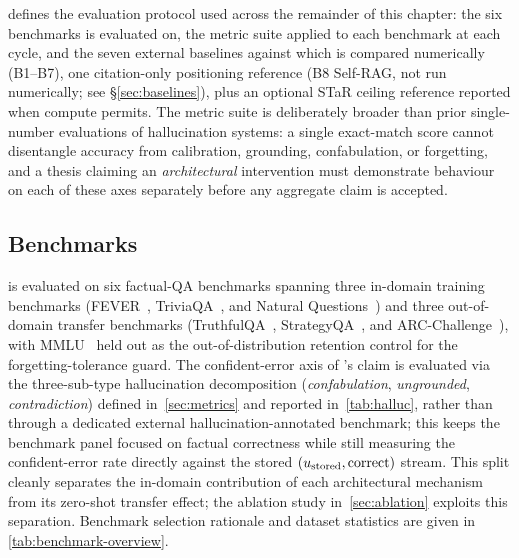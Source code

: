  defines the evaluation protocol used across the
remainder of this chapter: the six benchmarks \caem{} is evaluated on,
the metric suite applied to each benchmark at each cycle, and the seven
external baselines against which \caem{} is compared numerically
(B1--B7), one citation-only positioning reference (B8 Self-RAG, not run
numerically; see \S\ref{sec:baselines}), plus an optional STaR ceiling
reference reported when compute permits. The
metric suite is deliberately broader than prior single-number
evaluations of hallucination systems: a single exact-match score cannot
disentangle accuracy from calibration, grounding, confabulation, or
forgetting, and a thesis claiming an \emph{architectural} intervention
must demonstrate behaviour on each of these axes separately before any
aggregate claim is accepted.

\subsection{Benchmarks}
\label{sec:benchmarks}

\caem{} is evaluated on six factual-QA benchmarks spanning three
in-domain training benchmarks (FEVER~\cite{thorne-etal-2018-fever},
TriviaQA~\cite{joshi-etal-2017-triviaqa}, and Natural
Questions~\cite{kwiatkowski-etal-2019-natural}) and three
out-of-domain transfer benchmarks
(TruthfulQA~\cite{lin-etal-2022-truthfulqa},
StrategyQA~\cite{10.1162/tacl_a_00370},
and ARC-Challenge~\cite{clark2018think}),
with MMLU~\cite{hendrycks2021measuring} held out as the out-of-distribution
retention control for the forgetting-tolerance guard.
The confident-error axis of \caem{}'s claim is evaluated via the
three-sub-type hallucination decomposition
(\emph{confabulation}, \emph{ungrounded}, \emph{contradiction})
defined in~\cref{sec:metrics} and reported in~\cref{tab:halluc},
rather than through a dedicated external hallucination-annotated
benchmark; this keeps the benchmark panel focused on factual
correctness while still measuring the confident-error rate directly
against the stored $(u_{\text{stored}}, \mathrm{correct})$ stream.
This split cleanly separates the in-domain contribution of each
architectural mechanism from its zero-shot transfer effect; the
ablation study in~\cref{sec:ablation} exploits this separation.
Benchmark selection rationale and dataset statistics are given in
\cref{tab:benchmark-overview}.

